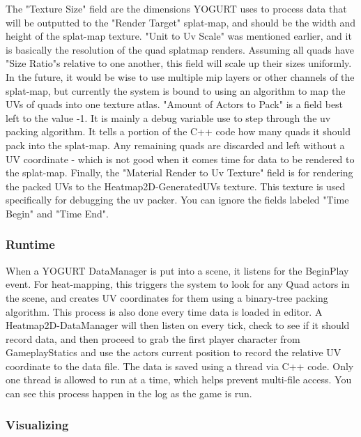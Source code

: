 \documentclass[journal]{IEEEtran}
\begin{document}
The "Texture Size" field are the dimensions YOGURT uses to process data that will be outputted to the "Render Target" splat-map, and should be the width and height of the splat-map texture. "Unit to Uv Scale" was mentioned earlier, and it is basically the resolution of the quad splatmap renders. Assuming all quads have "Size Ratio"s relative to one another, this field will scale up their sizes uniformly. In the future, it would be wise to use multiple mip layers or other channels of the splat-map, but currently the system is bound to using an algorithm to map the UVs of quads into one texture atlas. "Amount of Actors to Pack" is a field best left to the value -1. It is mainly a debug variable use to step through the uv packing algorithm. It tells a portion of the C++ code how many quads it should pack into the splat-map. Any remaining quads are discarded and left without a UV coordinate - which is not good when it comes time for data to be rendered to the splat-map. Finally, the "Material Render to Uv Texture" field is for rendering the packed UVs to the Heatmap2D-GeneratedUVs texture. This texture is used specifically for debugging the uv packer. You can ignore the fields labeled "Time Begin" and "Time End".

\subsubsection{Runtime}


When a YOGURT DataManager is put into a scene, it listens for the BeginPlay event. For heat-mapping, this triggers the system to look for any Quad actors in the scene, and creates UV coordinates for them using a binary-tree packing algorithm. This process is also done every time data is loaded in editor. A Heatmap2D-DataManager will then listen on every tick, check to see if it should record data, and then proceed to grab the first player character from GameplayStatics and use the actors current position to record the relative UV coordinate to the data file. The data is saved using a thread via C++ code. Only one thread is allowed to run at a time, which helps prevent multi-file access. You can see this process happen in the log as the game is run.

\subsubsection{Visualizing}
\end{document}
